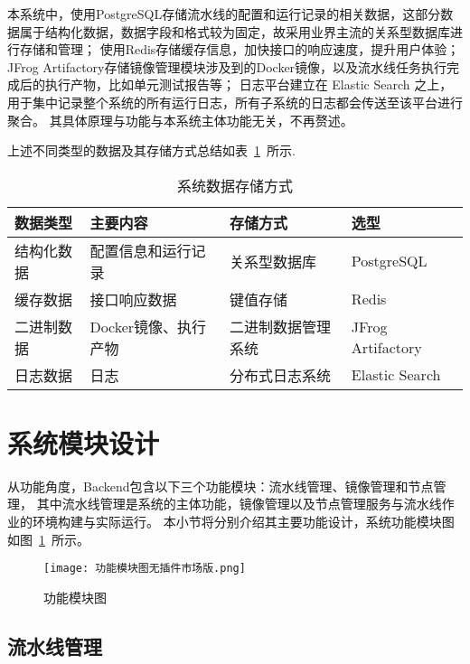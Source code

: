 本系统中，使用PostgreSQL存储流水线的配置和运行记录的相关数据，这部分数据属于结构化数据，数据字段和格式较为固定，故采用业界主流的关系型数据库进行存储和管理；
使用Redis存储缓存信息，加快接口的响应速度，提升用户体验；
JFrog Artifactory存储镜像管理模块涉及到的Docker镜像，以及流水线任务执行完成后的执行产物，比如单元测试报告等；
日志平台建立在 Elastic Search 之上，用于集中记录整个系统的所有运行日志，所有子系统的日志都会传送至该平台进行聚合。
其具体原理与功能与本系统主体功能无关，不再赘述。

上述不同类型的数据及其存储方式总结如表~\ref{tab:系统数据存储方式}~所示.

\begin{table}[h]
  \centering
  \caption{系统数据存储方式}
  \label{tab:系统数据存储方式}
  \begin{tabular}{llll}
    \toprule
    数据类型 & 主要内容      & 存储方式   & 选型 \\
    \midrule
    结构化数据     & 配置信息和运行记录      & 关系型数据库   & PostgreSQL       \\
    缓存数据       & 接口响应数据                   & 键值存储   & Redis       \\
    二进制数据     & Docker镜像、执行产物  & 二进制数据管理系统   & JFrog Artifactory   \\
    日志数据       & 日志                & 分布式日志系统  & Elastic Search       \\
    \bottomrule
  \end{tabular}
\end{table}

\section{系统模块设计}

从功能角度，Backend包含以下三个功能模块：流水线管理、镜像管理和节点管理，
其中流水线管理是系统的主体功能，镜像管理以及节点管理服务与流水线作业的环境构建与实际运行。
本小节将分别介绍其主要功能设计，系统功能模块图如图~\ref{fig:功能模块图}~所示。

\begin{figure}[h]
  \centering
  \texttt{[image: 功能模块图无插件市场版.png]}
  \caption{功能模块图}
  \label{fig:功能模块图}
\end{figure}

\subsection{流水线管理}

